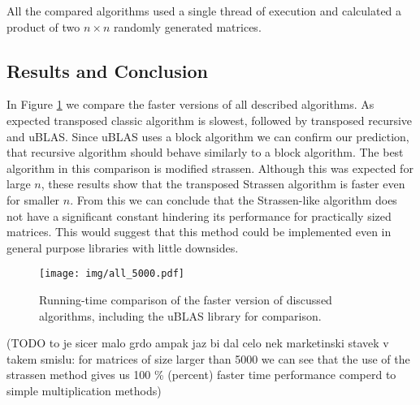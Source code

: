 \documentclass[a4paper,11pt]{article}
\begin{document}
 All the compared algorithms used a single thread of execution and calculated a product of two $n \times n$ randomly generated matrices. 


\subsection{Results and Conclusion}

In Figure \ref{fig:all_algorithms} we compare the faster versions of all described algorithms. As expected transposed classic algorithm is slowest, followed by transposed recursive and uBLAS. Since uBLAS uses a block algorithm we can confirm our prediction, that recursive algorithm should behave similarly to a block algorithm. The best algorithm in this comparison is modified strassen. 
Although this was expected for large $n$, these results show that the transposed Strassen algorithm is faster even for smaller $n$. From this we can conclude that the Strassen-like algorithm does not have a significant constant hindering its performance for practically sized matrices. This would suggest that this method could be implemented even in general purpose libraries with little downsides.

\begin{figure}[h]
\centering
\texttt{[image: img/all\_5000.pdf]}
\caption{Running-time comparison of the faster version of discussed algorithms, including the uBLAS library for comparison.}
\label{fig:all_algorithms}
\end{figure}

(TODO to je sicer malo grdo ampak jaz bi dal celo nek marketinski stavek v takem smislu: for matrices of size larger than 5000 we can see that the use of the strassen method gives us 100 \%  (percent) faster time performance comperd to simple multiplication methods)



\end{document}
